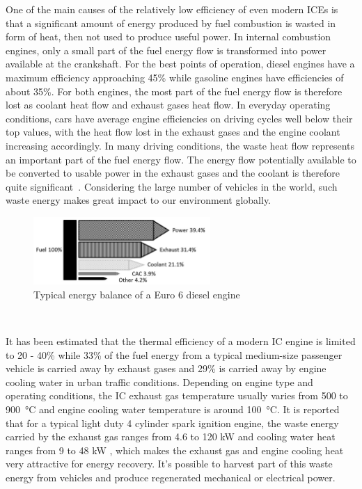 One of the main causes of the relatively low efficiency of even modern ICEs is that a significant amount of energy produced by fuel combustion is wasted in form of heat, then not used to produce useful power. In internal combustion engines, only a small part of the fuel energy flow is transformed into power available at the crankshaft. For the best points of operation, diesel engines have a maximum efficiency approaching 45\% while gasoline engines have efficiencies of about 35\%. For both engines, the most part of the fuel energy flow is therefore lost as coolant heat flow and exhaust gases heat flow. In everyday operating conditions, cars have average engine efficiencies on driving cycles well below their top values, with the heat flow lost in the exhaust gases and the engine coolant increasing accordingly. In many driving conditions, the waste heat flow represents an important part of the fuel energy flow. The energy flow potentially available to be converted to usable power in the exhaust gases and the coolant is therefore quite significant~\cite{Boretti2012}. Considering the large number of vehicles in the world, such waste energy makes great impact to our environment globally.

\begin{figure}[ht]
  \centering
  \includegraphics[width=0.6\textwidth]{figures/review/sankey.png}
  \caption{Typical energy balance of a Euro 6 diesel engine\label{fig:sankey_energy} }
\end{figure}
~

It has been estimated that the thermal efficiency of a modern IC engine is limited to 20 - 40\% while 33\% of the fuel energy from a typical medium-size passenger vehicle is carried away by exhaust gases and 29\% is carried away by engine cooling water in urban traffic conditions. Depending on engine type and operating conditions, the IC exhaust gas temperature usually varies from 500 to \SI{900}{\celsius} and engine cooling water temperature is around \SI{100}{\celsius}. It is reported that for a typical light duty 4 cylinder spark ignition engine, the waste energy carried by the exhaust gas ranges from 4.6 to 120 kW and cooling water heat ranges from 9 to 48 kW \cite{ElChammas2005}, which makes the exhaust gas and engine cooling heat very attractive for energy recovery. It's possible to harvest part of this waste energy from vehicles and produce regenerated mechanical or electrical power.

